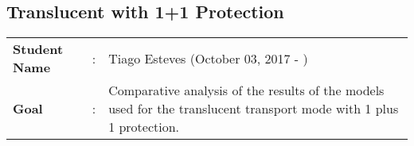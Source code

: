 \clearpage

\subsection{Translucent with 1+1 Protection}\label{comparative_Transluc_Protection}
\begin{tcolorbox}	
\begin{tabular}{p{2.75cm} p{0.2cm} p{10.5cm}} 	
\textbf{Student Name}  &:& Tiago Esteves    (October 03, 2017 - )\\
\textbf{Goal}          &:& Comparative analysis of the results of the models used for the translucent transport mode with 1 plus 1 protection.
\end{tabular}
\end{tcolorbox}
\vspace{11pt}

